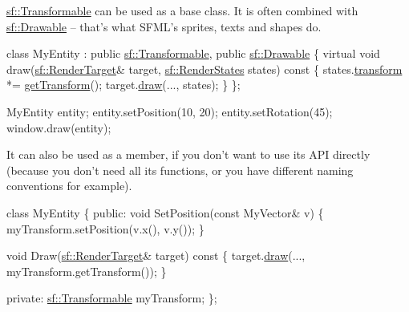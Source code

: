 \hyperlink{classsf_1_1_transformable}{sf\-::\-Transformable} can be used as a base class. It is often combined with \hyperlink{classsf_1_1_drawable}{sf\-::\-Drawable} -- that's what S\-F\-M\-L's sprites, texts and shapes do. 
\begin{DoxyCode}
\textcolor{keyword}{class }MyEntity : \textcolor{keyword}{public} \hyperlink{classsf_1_1_transformable}{sf::Transformable}, \textcolor{keyword}{public} \hyperlink{classsf_1_1_drawable}{sf::Drawable}
\{
    \textcolor{keyword}{virtual} \textcolor{keywordtype}{void} draw(\hyperlink{classsf_1_1_render_target}{sf::RenderTarget}& target, \hyperlink{classsf_1_1_render_states}{sf::RenderStates} states)\textcolor{keyword}{
       const}
\textcolor{keyword}{    }\{
        states.\hyperlink{classsf_1_1_render_states_a1f737981a0f2f0d4bb8dac866a8d1149}{transform} *= \hyperlink{classsf_1_1_transformable_a3b48c3362e3e2c14fef7551252deb7bb}{getTransform}();
        target.\hyperlink{classsf_1_1_render_target_a12417a3bcc245c41d957b29583556f39}{draw}(..., states);
    \}
\};

MyEntity entity;
entity.setPosition(10, 20);
entity.setRotation(45);
window.draw(entity);
\end{DoxyCode}


It can also be used as a member, if you don't want to use its A\-P\-I directly (because you don't need all its functions, or you have different naming conventions for example). 
\begin{DoxyCode}
\textcolor{keyword}{class }MyEntity
\{
\textcolor{keyword}{public}:
    \textcolor{keywordtype}{void} SetPosition(\textcolor{keyword}{const} MyVector& v)
    \{
        myTransform.setPosition(v.x(), v.y());
    \}

    \textcolor{keywordtype}{void} Draw(\hyperlink{classsf_1_1_render_target}{sf::RenderTarget}& target)\textcolor{keyword}{ const}
\textcolor{keyword}{    }\{
        target.\hyperlink{classsf_1_1_render_target_a12417a3bcc245c41d957b29583556f39}{draw}(..., myTransform.getTransform());
    \}

\textcolor{keyword}{private}:
    \hyperlink{classsf_1_1_transformable}{sf::Transformable} myTransform;
\};
\end{DoxyCode}


